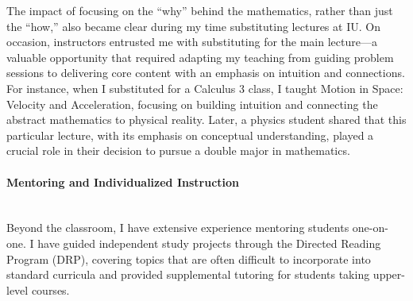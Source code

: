 \documentclass[11pt]{article}
\begin{document}
The impact of focusing on the ``why'' behind the mathematics, rather than just the ``how,'' also became clear during my time substituting lectures at IU. On occasion, instructors entrusted me with substituting for the main lecture—a valuable opportunity that required adapting my teaching from guiding problem sessions to delivering core content with an emphasis on intuition and connections. For instance, when I substituted for a Calculus 3 class, I taught Motion in Space: Velocity and Acceleration, focusing on building intuition and connecting the abstract mathematics to physical reality. Later, a physics student shared that this particular lecture, with its emphasis on conceptual understanding, played a crucial role in their decision to pursue a double major in mathematics.



\paragraph{Mentoring and Individualized Instruction}\quad \\
Beyond the classroom, I have extensive experience mentoring students one-on-one. I have guided independent study projects through the Directed Reading Program (DRP), covering topics that are often difficult to incorporate into standard curricula and provided supplemental tutoring for students taking upper-level courses.
\end{document}
